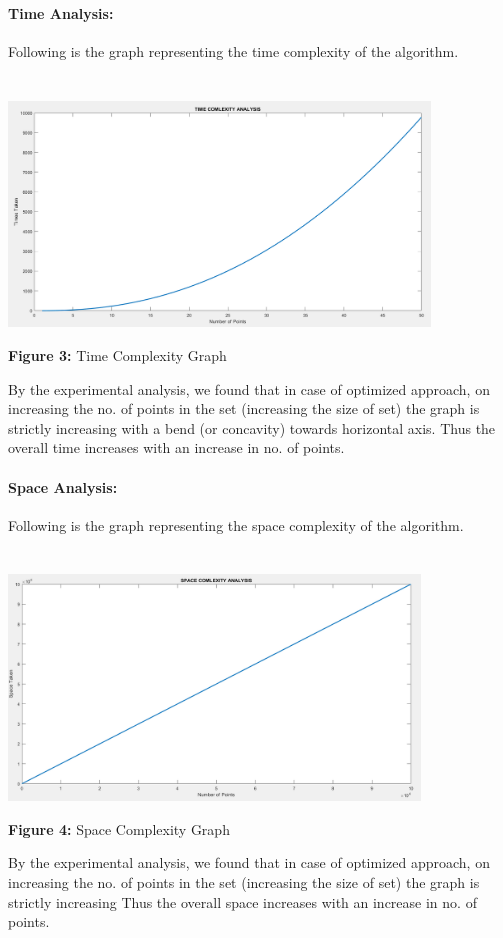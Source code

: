 \documentclass[10pt]{article}
\begin{document}
\begin{multicols*}{2}
\paragraph{Time Analysis:}Following is the graph representing the time complexity of the algorithm.\\\\\\
\includegraphics[width=\columnwidth, height=6cm]{Time Complexity.png}\begin{center}\textbf{Figure 3:} Time Complexity Graph\end{center}By the experimental analysis, we found that in  case of optimized approach, on increasing the no. of points in the set (increasing the size of set) the graph is strictly increasing with a bend (or concavity) towards horizontal axis. Thus the overall time increases with an increase in no. of points.

\paragraph{Space Analysis:}Following is the graph representing the space complexity of the algorithm.\\\\\\
\includegraphics[width=\columnwidth, height=6cm]{Space Complexity.png}\begin{center}\textbf{Figure 4:} Space Complexity Graph\end{center}By the experimental analysis, we found that in case of optimized approach, on increasing the no. of points in the set (increasing the size of set) the graph is strictly increasing Thus the overall space increases with an increase in no. of points.\\\\


\end{multicols*}
\end{document}
